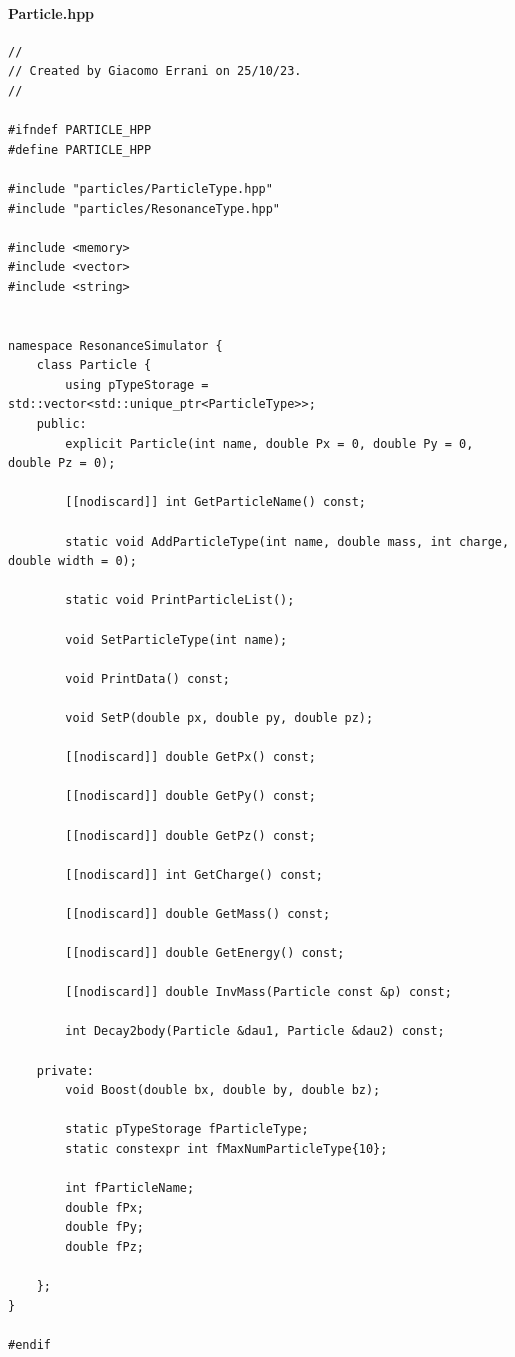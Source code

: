 \documentclass[12pt, a4paper]{article}
\begin{document}
\paragraph{Particle.hpp}
\begin{verbatim}
//
// Created by Giacomo Errani on 25/10/23.
//

#ifndef PARTICLE_HPP
#define PARTICLE_HPP

#include "particles/ParticleType.hpp"
#include "particles/ResonanceType.hpp"

#include <memory>
#include <vector>
#include <string>


namespace ResonanceSimulator {
    class Particle {
        using pTypeStorage = std::vector<std::unique_ptr<ParticleType>>;
    public:
        explicit Particle(int name, double Px = 0, double Py = 0, double Pz = 0);

        [[nodiscard]] int GetParticleName() const;

        static void AddParticleType(int name, double mass, int charge, double width = 0);

        static void PrintParticleList();

        void SetParticleType(int name);

        void PrintData() const;

        void SetP(double px, double py, double pz);

        [[nodiscard]] double GetPx() const;

        [[nodiscard]] double GetPy() const;

        [[nodiscard]] double GetPz() const;

        [[nodiscard]] int GetCharge() const;

        [[nodiscard]] double GetMass() const;

        [[nodiscard]] double GetEnergy() const;

        [[nodiscard]] double InvMass(Particle const &p) const;

        int Decay2body(Particle &dau1, Particle &dau2) const;

    private:
        void Boost(double bx, double by, double bz);

        static pTypeStorage fParticleType;
        static constexpr int fMaxNumParticleType{10};

        int fParticleName;
        double fPx;
        double fPy;
        double fPz;

    };
}

#endif

\end{verbatim}
\end{document}
